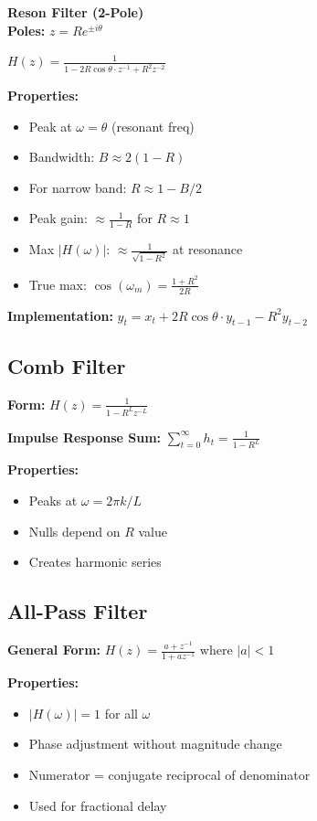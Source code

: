 \documentclass[8pt,landscape,a4paper]{article}
\newcommand{\important}[1]{\colorbox{yellow!25}{$\displaystyle #1$}}
\begin{document}
\begin{multicols}{4}
\textbf{Reson Filter (2-Pole)}\\
\textbf{Poles:} $z = Re^{\pm i\theta}$

\important{H(z) = \frac{1}{1 - 2R\cos\theta \cdot z^{-1} + R^2z^{-2}}}

\textbf{Properties:}
\begin{itemize}
\item Peak at $\omega = \theta$ (resonant freq)
\item Bandwidth: $B \approx 2(1-R)$
\item For narrow band: $R \approx 1 - B/2$
\item Peak gain: $\approx \frac{1}{1-R}$ for $R \approx 1$
\item Max $|H(\omega)|$: $\approx \frac{1}{\sqrt{1-R^2}}$ at resonance
\item True max: $\cos(\omega_m) = \frac{1+R^2}{2R}$
\end{itemize}

\textbf{Implementation:}
$y_t = x_t + 2R\cos\theta \cdot y_{t-1} - R^2y_{t-2}$

\subsection*{Comb Filter}
\textbf{Form:} $H(z) = \frac{1}{1 - R^Lz^{-L}}$

\textbf{Impulse Response Sum:}
$\sum_{t=0}^{\infty} h_t = \frac{1}{1-R^L}$

\textbf{Properties:}
\begin{itemize}
\item Peaks at $\omega = 2\pi k/L$
\item Nulls depend on $R$ value
\item Creates harmonic series
\end{itemize}

\subsection*{All-Pass Filter}
\textbf{General Form:}
$H(z) = \frac{a + z^{-1}}{1 + az^{-1}}$ where $|a| < 1$

\textbf{Properties:}
\begin{itemize}
\item $|H(\omega)| = 1$ for all $\omega$
\item Phase adjustment without magnitude change
\item Numerator = conjugate reciprocal of denominator
\item Used for fractional delay
\end{itemize}


\end{multicols}
\end{document}
